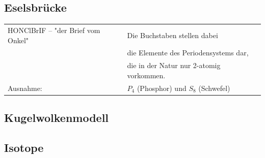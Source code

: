 \subsection{Eselsbrücke}

\begin{tabular}{ll} 
    HONClBrIF – "der Brief vom Onkel"   &  Die Buchstaben stellen dabei \\
     & die Elemente des Periodensystems dar,\\
     & die in der Natur nur 2-atomig vorkommen. \\
    Ausnahme: & $P_4$ (Phosphor) und $S_8$ (Schwefel)  \\
\end{tabular}
\renewcommand{\arraystretch}{1}      
         

\subsection{Kugelwolkenmodell}	

\subsection{Isotope}

  
           